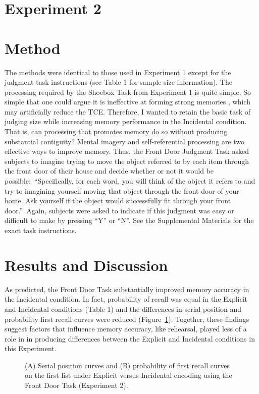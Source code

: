 \documentclass[man,natbib,floatsintext]{apa6} %
\begin{document}
\section{Experiment 2}
\section{Method}

The methods were identical to those used in Experiment 1 except for the judgment task instructions (see Table 1 for sample size information).
The processing required by the Shoebox Task from Experiment 1 is quite simple. So simple that one could argue it is  ineffective at forming strong memories \label{newcite}\citep{EaglLeit64}, which may artificially reduce the TCE. Therefore, I wanted to retain the basic task of judging size while increasing memory performance in the Incidental condition. That is, can processing that promotes memory do so without producing substantial contiguity? Mental imagery and self-referential processing are two effective ways to improve memory. Thus, the Front Door Judgment Task asked subjects to imagine trying to move the object referred to by each item through the front door of their house and decide whether or not it would be possible:~\label{newinst}\color{red}``Specifically, for each word, you will think of the object it refers to and try to imagining yourself moving that object through the front door of your home. Ask yourself if the object would successfully fit through your front door.''\color{black}~Again, subjects were asked to indicate if this judgment was easy or difficult to make by pressing ``Y'' or ``N''. See the Supplemental Materials for the exact task instructions.

\section{Results and Discussion}
As predicted, the Front Door Task substantially improved memory accuracy in the Incidental condition. In fact, probability of recall was equal in the Explicit and Incidental conditions (Table 1) \color{red} and the differences in serial position and probability first recall curves were reduced (Figure~\ref{e2_l1_spc}). Together, these findings suggest factors that influence memory accuracy, like rehearsal, played less of a role in in producing differences between the Explicit and Incidental conditions in this Experiment.

\begin{figure}
\caption{(A) Serial position curves and (B) probability of first recall curves on the first list under Explicit versus Incidental encoding using the Front Door Task (Experiment 2). \spcpaneltext}
\label{e2_l1_spc}
\end{figure}
\end{document}

